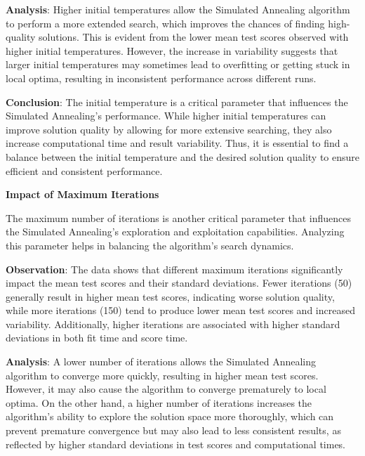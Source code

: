\documentclass{article}
\begin{document}
    \textbf{Analysis}: Higher initial temperatures allow the Simulated Annealing algorithm to perform a more extended search, which improves the chances of finding high-quality solutions. This is evident from the lower mean test scores observed with higher initial temperatures. However, the increase in variability suggests that larger initial temperatures may sometimes lead to overfitting or getting stuck in local optima, resulting in inconsistent performance across different runs.

    \textbf{Conclusion}: The initial temperature is a critical parameter that influences the Simulated Annealing's performance. While higher initial temperatures can improve solution quality by allowing for more extensive searching, they also increase computational time and result variability. Thus, it is essential to find a balance between the initial temperature and the desired solution quality to ensure efficient and consistent performance.

    \textbf{Impact of Maximum Iterations}

    The maximum number of iterations is another critical parameter that influences the Simulated Annealing’s exploration and exploitation capabilities. Analyzing this parameter helps in balancing the algorithm’s search dynamics.

    \textbf{Observation}: The data shows that different maximum iterations significantly impact the mean test scores and their standard deviations. Fewer iterations (50) generally result in higher mean test scores, indicating worse solution quality, while more iterations (150) tend to produce lower mean test scores and increased variability. Additionally, higher iterations are associated with higher standard deviations in both fit time and score time.

    \textbf{Analysis}: A lower number of iterations allows the Simulated Annealing algorithm to converge more quickly, resulting in higher mean test scores. However, it may also cause the algorithm to converge prematurely to local optima. On the other hand, a higher number of iterations increases the algorithm's ability to explore the solution space more thoroughly, which can prevent premature convergence but may also lead to less consistent results, as reflected by higher standard deviations in test scores and computational times.
\end{document}
